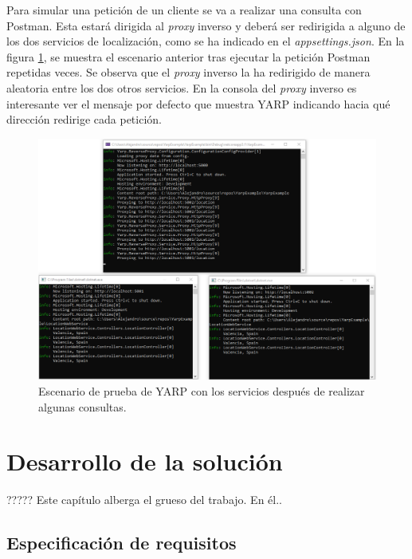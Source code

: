 \documentclass[11pt,spanish,listoffigures]{tfgetsinf}
\begin{document}
Para simular una petición de un cliente se va a realizar una consulta con Postman. Esta estará dirigida al \emph{proxy} inverso y deberá ser redirigida a alguno de los dos servicios de localización, como se ha indicado en el \emph{appsettings.json}. En la figura \ref{ejemploYARP_servicios_funcionando}, se muestra el escenario anterior tras ejecutar la petición Postman repetidas veces. Se observa que el \emph{proxy} inverso la ha redirigido de manera aleatoria entre los dos otros servicios. En la consola del \emph{proxy} inverso es interesante ver el mensaje por defecto que muestra YARP indicando hacia qué dirección redirige cada petición.

\begin{figure}[ht]
\centering
\includegraphics[width=1\textwidth]{imagenes/ejemploYARP/servicios_funcionando}
\caption{Escenario de prueba de YARP con los servicios después de realizar algunas consultas.}
	\label{ejemploYARP_servicios_funcionando}
\end{figure}


\chapter{Desarrollo de la solución}

????? Este capítulo alberga el grueso del trabajo. En él..


	\section{Especificación de requisitos} \label{especificacionRequisitos}
\end{document}
